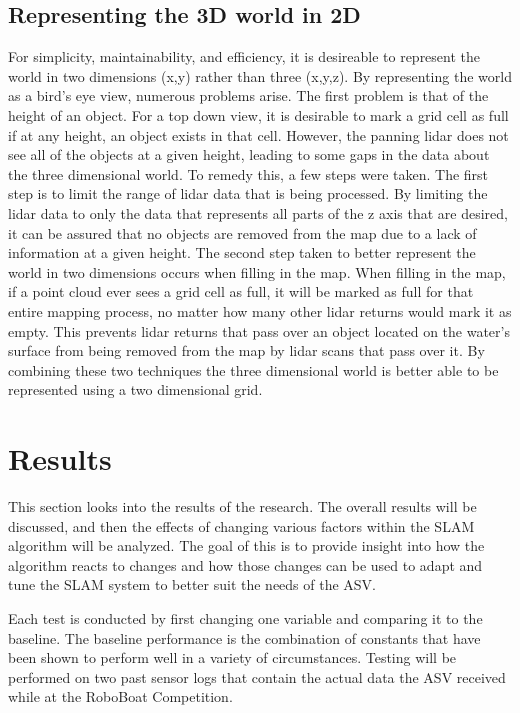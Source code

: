 \documentclass[10pt]{IEEEtran}
\begin{document}
\subsection{Representing the 3D world in 2D}
For simplicity, maintainability, and efficiency, it is desireable to represent the world in
two dimensions (x,y) rather than three (x,y,z).  By representing the world as a
bird's eye view, numerous problems arise.  The first problem is that of the height of an 
object.  For a top down view, it is desirable to mark a grid cell as full if at any height,
an object exists in that cell.  However, the panning lidar does not see all of the
objects at a given height, leading to some gaps in the data about the three dimensional
world.  To remedy this, a few steps were taken.  The first step is to limit the range
of lidar data that is being processed.  By limiting the lidar data to only the data that
represents all parts of the z axis that are desired, it can be assured that no objects are
removed from the map due to a lack of information at a given height.  The second
step taken to better represent the world in two dimensions occurs when filling in the map.
When filling in the map, if a point cloud ever sees a grid cell as full, it will be marked
as full for that entire mapping process, no matter how many other lidar returns would
mark it as empty.  This prevents lidar returns that pass over an object located on the
water's surface from being removed from the map by lidar scans that pass over it.  By 
combining these two techniques the three dimensional world is better able to be
represented using a two dimensional grid.


\section{Results}
This section looks into the results of the research.  The overall results will be discussed,
and then the effects of changing various factors within the SLAM algorithm will be 
analyzed.  The goal of this is to provide insight into how the algorithm reacts to changes
and how those changes can be used to adapt and tune the SLAM system to better suit the 
needs of the ASV.  

Each test is conducted by first changing one variable and comparing it to the baseline.
The baseline performance is the combination of constants that have been shown to perform
well in a variety of circumstances.  Testing will be performed on two past sensor logs that
contain the actual data the ASV received while at the RoboBoat Competition.
\end{document}
